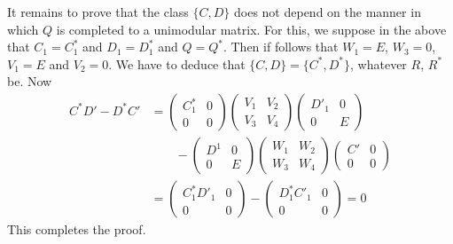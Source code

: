 It remains to prove that the class $\{ C, D \}$ does not depend on the
manner in which $Q$ is completed to a unimodular matrix. For this, we
suppose in the above that $C_1 = C^*_1$ and $D_1 = D^*_1$ and $Q =
Q^*$. Then if follows that $W_1 = E$, $W_3 = 0$, $V_1 = E$ and $V_2 =
0$. We have to deduce that $\{ C, D \} = \{ C^*, D^* \}$, whatever
$R$, $R^*$ be. Now 
\begin{align*}
C^* D' - D^* C' & = 
\begin{pmatrix}
C^*_1 & 0 \\ 
0 &  0 
\end{pmatrix} \begin{pmatrix}V_1 & V_2 \\ V_3 &
  V_4 \end{pmatrix} \begin{pmatrix}D'_1 & 0 \\ 0 & E \end{pmatrix}\\[5pt]
& \qquad 
- \begin{pmatrix} D^1 & 0 \\ 0 & E \end{pmatrix} \begin{pmatrix} W_1 &
  W_2 \\ W_3 & W_4 \end{pmatrix} \begin{pmatrix}C' & 0 \\ 0 &
  0 \end{pmatrix}\\[5pt] 
& = \begin{pmatrix}C^*_1   D'_1 & 0 \\ 0 & 0 \end{pmatrix}
- \begin{pmatrix}D^*_1   C'_1 & 0 \\ 0 & 0 \end{pmatrix} = 0 
\end{align*}
This completes the proof.


